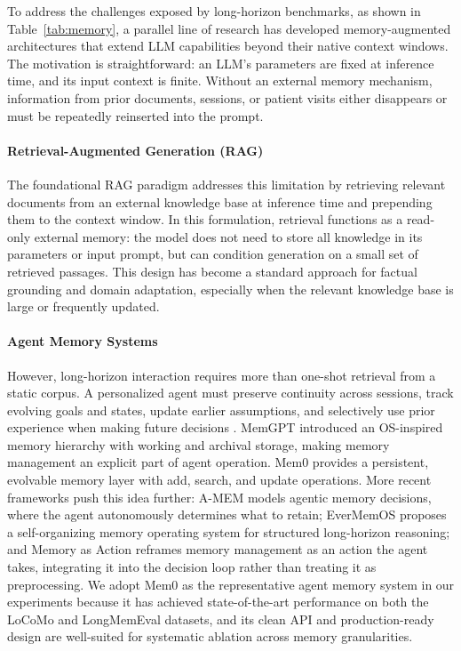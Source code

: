 To address the challenges exposed by long-horizon benchmarks, as shown in Table~\ref{tab:memory}, a parallel line of research has developed memory-augmented architectures that extend LLM capabilities beyond their native context windows. The motivation is straightforward: an LLM's parameters are fixed at inference time, and its input context is finite. Without an external memory mechanism, information from prior documents, sessions, or patient visits either disappears or must be repeatedly reinserted into the prompt.

\paragraph{Retrieval-Augmented Generation (RAG)} The foundational RAG paradigm \cite{lewis2020rag} addresses this limitation by retrieving relevant documents from an external knowledge base at inference time and prepending them to the context window. In this formulation, retrieval functions as a read-only external memory: the model does not need to store all knowledge in its parameters or input prompt, but can condition generation on a small set of retrieved passages. This design has become a standard approach for factual grounding and domain adaptation, especially when the relevant knowledge base is large or frequently updated.

\paragraph{Agent Memory Systems} However, long-horizon interaction requires more than one-shot retrieval from a static corpus. A personalized agent must preserve continuity across sessions, track evolving goals and states, update earlier assumptions, and selectively use prior experience when making future decisions \cite{memory-in-the-age-of-ai-agents}. MemGPT \cite{packer2023memgpt} introduced an OS-inspired memory hierarchy with working and archival storage, making memory management an explicit part of agent operation. Mem0 \cite{mem0_reference} provides a persistent, evolvable memory layer with add, search, and update operations. More recent frameworks push this idea further: A-MEM \cite{amem2025} models agentic memory decisions, where the agent autonomously determines what to retain; EverMemOS \cite{hu2026evermemosselforganizingmemoryoperating} proposes a self-organizing memory operating system for structured long-horizon reasoning; and Memory as Action \cite{memoryasaction2025} reframes memory management as an action the agent takes, integrating it into the decision loop rather than treating it as preprocessing. We adopt Mem0 \cite{mem0_reference} as the representative agent memory system in our experiments because it has achieved state-of-the-art performance on both the LoCoMo \cite{maharana2024evaluating} and LongMemEval \cite{wu2024longmemeval} datasets, and its clean API and production-ready design are well-suited for systematic ablation across memory granularities. 

